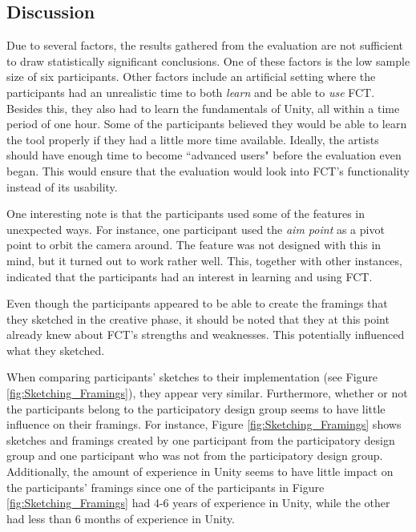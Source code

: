 \subsection{Discussion}


Due to several factors, the results gathered from the evaluation are not sufficient to draw statistically significant conclusions. One of these factors is the low sample size of six participants. Other factors include an artificial setting where the participants had an unrealistic time to both \textit{learn} and be able to \textit{use} FCT. Besides this, they also had to learn the fundamentals of Unity, all within a time period of one hour. Some of the participants believed they would be able to learn the tool properly if they had a little more time available. Ideally, the artists should have enough time to become ``advanced users" before the evaluation even began. This would ensure that the evaluation would look into FCT's functionality instead of its usability.

One interesting note is that the participants used some of the features in unexpected ways. For instance, one participant used the \textit{aim point} as a pivot point to orbit the camera around. The feature was not designed with this in mind, but it turned out to work rather well. This, together with other instances, indicated that the participants had an interest in learning and using FCT.

Even though the participants appeared to be able to create the framings that they sketched in the creative phase, it should be noted that they at this point already knew about FCT's strengths and weaknesses. This potentially influenced what they sketched.

When comparing participants' sketches to their implementation (see Figure \ref{fig:Sketching_Framings}), they appear very similar. 
Furthermore, whether or not the participants belong to the participatory design group seems to have little influence on their framings. For instance, Figure \ref{fig:Sketching_Framings} shows sketches and framings created by one participant from the participatory design group and one participant who was not from the participatory design group.
Additionally, the amount of experience in Unity seems to have little impact on the participants' framings since one of the participants in Figure \ref{fig:Sketching_Framings} had 4-6 years of experience in Unity, while the other had less than 6 months of experience in Unity.

